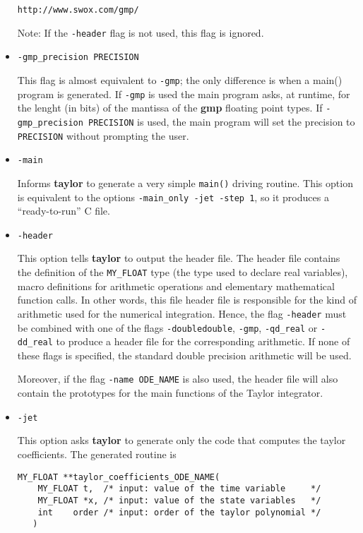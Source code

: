 \documentclass{article}
\begin{document}
\begin{itemize}
{{\tt http://www.swox.com/gmp/}

Note: If the {\tt -header} flag is not used, this flag is
ignored.}

\item{\verb+-gmp_precision PRECISION+

This flag is almost equivalent to {\tt -gmp}; the only difference is
when a main() program is generated. If {\tt -gmp} is used the main
program asks, at runtime, for the lenght (in bits) of the mantissa of
the {\bf gmp} floating point types. If {\tt -gmp\_precision PRECISION}
is used, the main program will set the precision to {\tt PRECISION}
without prompting the user.}

\item{\verb+-main+

Informs {\bf taylor} to generate a very simple \verb+main()+ driving
routine. This option is equivalent to the options {\tt -main\_only
-jet -step 1}, so it produces a ``ready-to-run'' C file.  }

\item{\verb+-header+ 

This option tells {\bf taylor} to output the
header file. The header file contains the definition
of the {\tt MY\_FLOAT} type (the type used to declare
real variables), macro definitions
for arithmetic operations and elementary mathematical 
function calls. In other words, this file header
file is responsible for the kind of arithmetic
used for the numerical integration.
Hence, the flag {\tt -header} must be combined with
one of the flags {\tt -doubledouble}, {\tt -gmp}, {\tt -qd\_real}
or {\tt -dd\_real} to produce a header file for the
corresponding arithmetic. If none of these flags is
specified, the standard double precision arithmetic will
be used.

Moreover, if the flag {\tt -name ODE\_NAME} is also used, the header
file will also contain the prototypes for the main functions of the
Taylor integrator.}

\item{\verb+-jet+

This option asks {\bf taylor} to generate only the code that 
computes the taylor coefficients. The generated routine is

\begin{verbatim}
MY_FLOAT **taylor_coefficients_ODE_NAME(
    MY_FLOAT t,  /* input: value of the time variable     */
    MY_FLOAT *x, /* input: value of the state variables   */
    int    order /* input: order of the taylor polynomial */
   )
\end{verbatim}

}
\end{itemize}
\end{document}

